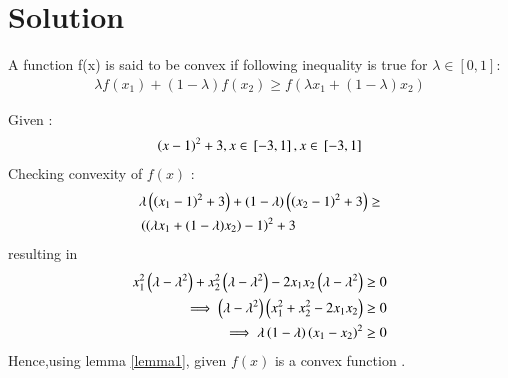 \documentclass[journal,12pt,twocolumn]{IEEEtran}
\begin{document}
\section{Solution}
\begin{lemma}
A function f(x) is said to be convex if following inequality is true for $\lambda \in [0,1] :$  \label{lemma1}
\begin{align}
    \lambda f(x_1) + (1-\lambda)f(x_2) \geq f(\lambda x_1 + (1-\lambda)x_2)
\end{align}
\end{lemma}
Given :
\begin{align}
    \left(x-1\right)^2+3,x \in {}\left[-3,1\right] , x \in {}\left[-3,1\right]
\end{align}
Checking convexity of $f(x)$ :
\begin{equation}
\begin{aligned}
    &\lambda\left(\left(x_1-1\right)^2+3\right) + (1-\lambda)\left(\left(x_2-1\right)^2+3\right) \geq \\
    &\left(\left(\lambda x_1 + (1-\lambda)x_2\right)-1\right)^2 +3
\end{aligned}
\end{equation}
resulting in
\begin{align}
    x_1^2\left(\lambda-\lambda^2\right)+x_2^2\left({\lambda-\lambda^2}\right)- 2x_1x_2\left({\lambda-\lambda^2}\right) &\geq 0 \\
    \implies \left(\lambda-\lambda^2\right)\left(x_1^2+x_2^2-2x_1x_2\right) &\geq 0 \\
    \implies \lambda\left(1-\lambda\right)\left(x_1-x_2\right)^2 &\geq 0 
\end{align}
Hence,using lemma \ref{lemma1}, given $f(x)$ is a convex function .
\end{document}
